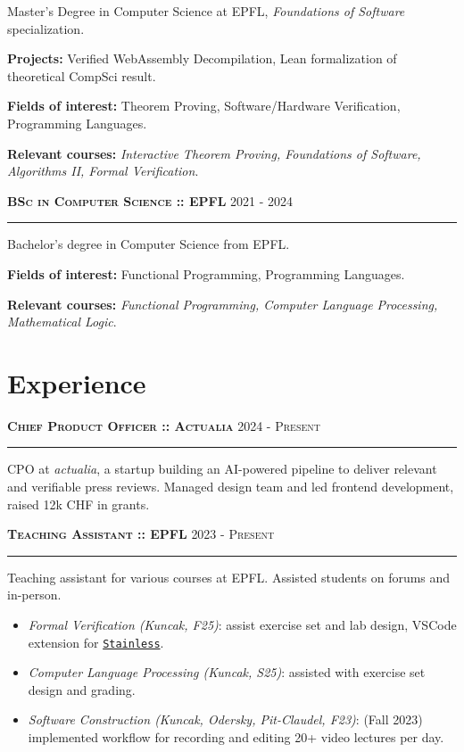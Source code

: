 \documentclass[11pt]{article}
\renewcommand{\url}[1]{{\texttt{#1}}}
\renewcommand{\line}[2]{{\vspace{12pt} \large \noindent\textbf{\textsc{#1}} \hfill \small{#2}}{\vspace{2pt}\hrule\vspace{4pt}}}
\begin{document}
  Master's Degree in Computer Science at EPFL, \textit{Foundations of Software} specialization.

  \textbf{Projects:} Verified WebAssembly Decompilation, Lean formalization of theoretical CompSci result.

  \textbf{Fields of interest:} Theorem Proving, Software/Hardware Verification, Programming Languages.

  \textbf{Relevant courses:} \textit{Interactive Theorem Proving, Foundations of Software, Algorithms II, Formal Verification}.

  \line{BSc in Computer Science :: EPFL}{2021 - 2024}

  Bachelor's degree in Computer Science from EPFL.

  \textbf{Fields of interest:} Functional Programming, Programming Languages.

  \textbf{Relevant courses:} \textit{Functional Programming, Computer Language Processing, Mathematical Logic}.

  \section*{Experience}
  \vspace{-1.5em}

  \line{Chief Product Officer :: Actualia}{2024 - \textsc{Present}}

  CPO at \textit{actualia}, a startup building an AI-powered pipeline to deliver relevant and verifiable press reviews. 
  Managed design team and led frontend development, raised 12k CHF in grants.

  \line{Teaching Assistant :: EPFL}{2023 - \textsc{Present}}

  Teaching assistant for various courses at EPFL. Assisted students on forums and in-person.

  \vspace{-0.5em}
  \begin{itemize}
    \item \textit{Formal Verification (Kuncak, F25)}: assist exercise set and lab design, VSCode extension for \href{https://github.com/epfl-lara/stainless}{\url{Stainless}}.
    \item \textit{Computer Language Processing (Kuncak, S25)}: assisted with exercise set design and grading.
    \item \textit{Software Construction (Kuncak, Odersky, Pit-Claudel, F23)}: (Fall 2023) implemented workflow for recording and editing 20+ video lectures per day.
  \end{itemize}
  \vspace{-1em}
\end{document}
